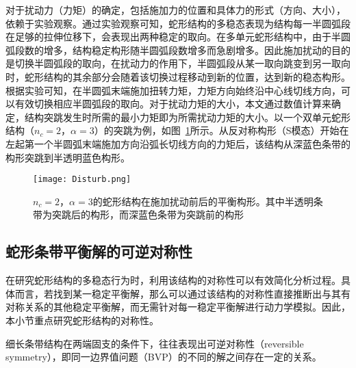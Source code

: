 对于扰动力（力矩）的确定，包括施加力的位置和具体力的形式（方向、大小），依赖于实验观察。通过实验观察可知，蛇形结构的多稳态表现为结构每一半圆弧段在足够的拉伸位移下，会表现出两种稳定的取向。在多单元蛇形结构中，由于半圆弧段数的增多，结构稳定构形随半圆弧段数增多而急剧增多。因此施加扰动的目的是切换半圆弧段的取向，在扰动力的作用下，半圆弧段从某一取向跳变到另一取向时，蛇形结构的其余部分会随着该切换过程移动到新的位置，达到新的稳态构形。根据实验可知，在半圆弧末端施加扭转力矩，力矩方向始终沿中心线切线方向，可以有效切换相应半圆弧段的取向。对于扰动力矩的大小，本文通过数值计算来确定，结构突跳发生时所需的最小力矩即为所需扰动力矩的大小。以一个双单元蛇形结构（$n_c=2$，$\alpha=3$）的突跳为例，如图~\ref{fig:Disturb}所示。从反对称构形（S模态）开始在左起第一个半圆弧末端施加方向沿弧长切线方向的力矩后，该结构从深蓝色条带的构形突跳到半透明蓝色构形。
\begin{figure}
	\centering
	\texttt{[image: Disturb.png]}
	\caption{$n_c=2$，$\alpha=3$的蛇形结构在施加扰动前后的平衡构形。其中半透明条带为突跳后的构形，而深蓝色条带为突跳前的构形}
	\label{fig:Disturb}
\end{figure}
\subsection{蛇形条带平衡解的可逆对称性}
在研究蛇形结构的多稳态行为时，利用该结构的对称性可以有效简化分析过程。具体而言，若找到某一稳定平衡解，那么可以通过该结构的对称性直接推断出与其有对称关系的其他稳定平衡解，而无需针对每一稳定平衡解进行动力学模拟。因此，本小节重点研究蛇形结构的对称性。

细长条带结构在两端固支的条件下，往往表现出可逆对称性\cite{starostin2022forceless,van1998lock,champneys1996multiplicity,domokos2001hidden}（reversible symmetry），即同一边界值问题（BVP）的不同的解之间存在一定的关系。

